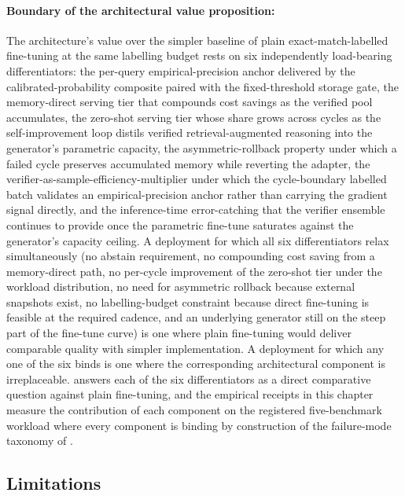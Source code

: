 \paragraph{Boundary of the architectural value proposition:} The architecture's value over the simpler baseline of plain exact-match-labelled fine-tuning at the same labelling budget rests on six independently load-bearing differentiators: the per-query empirical-precision anchor delivered by the calibrated-probability composite paired with the fixed-threshold storage gate, the memory-direct serving tier that compounds cost savings as the verified pool accumulates, the zero-shot serving tier whose share grows across cycles as the self-improvement loop distils verified retrieval-augmented reasoning into the generator's parametric capacity, the asymmetric-rollback property under which a failed cycle preserves accumulated memory while reverting the adapter, the verifier-as-sample-efficiency-multiplier under which the cycle-boundary labelled batch validates an empirical-precision anchor rather than carrying the gradient signal directly, and the inference-time error-catching that the verifier ensemble continues to provide once the parametric fine-tune saturates against the generator's capacity ceiling. A deployment for which all six differentiators relax simultaneously (no abstain requirement, no compounding cost saving from a memory-direct path, no per-cycle improvement of the zero-shot tier under the workload distribution, no need for asymmetric rollback because external snapshots exist, no labelling-budget constraint because direct fine-tuning is feasible at the required cadence, and an underlying generator still on the steep part of the fine-tune curve) is one where plain fine-tuning would deliver comparable quality with simpler implementation. A deployment for which any one of the six binds is one where the corresponding architectural component is irreplaceable.  answers each of the six differentiators as a direct comparative question against plain fine-tuning, and the empirical receipts in this chapter measure the contribution of each component on the registered five-benchmark workload where every component is binding by construction of the failure-mode taxonomy of .

\subsection{Limitations}
\label{sec:disc-limitations}

